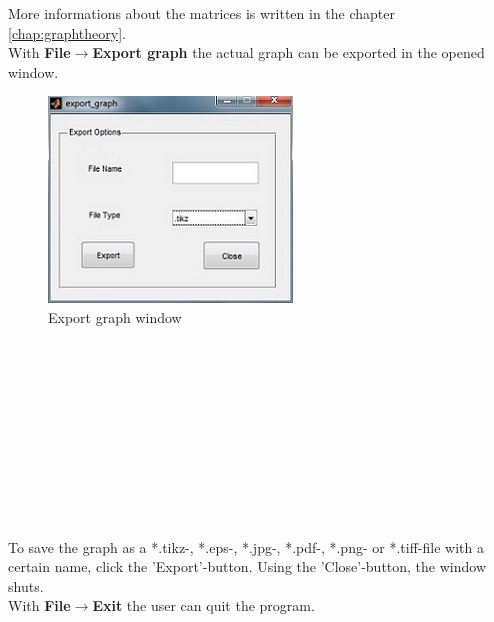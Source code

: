 \documentclass[12pt]{report}
\begin{document}
More informations about the matrices is written in the chapter \ref{chap:graphtheory}.\\
With \textbf{File$\rightarrow$Export graph} the actual graph can be exported in the opened window.\\
\begin{figure}[here]
\centering
\includegraphics[scale=.6]{exportgraph}
\caption{Export graph window}
\label{FIG:abb9}
\end{figure}
\\
\\
\\
\\
\\
\\
\\
\\
\\
\\
To save the graph as a *.tikz-, *.eps-, *.jpg-, *.pdf-, *.png- or *.tiff-file with a certain name, click the 'Export'-button. Using the 'Close'-button, the window shuts.\\
With \textbf{File$\rightarrow$Exit} the user can quit the program.\\
\\
\end{document}
